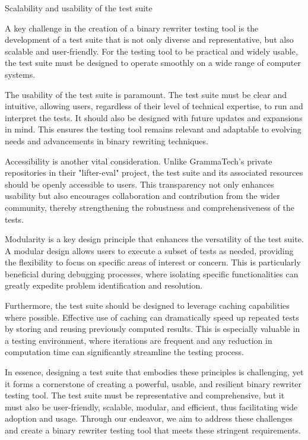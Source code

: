 \documentclass[a4paper,11pt,oneside]{report}
\begin{document}
Scalability and usability of the test suite

A key challenge in the creation of a binary rewriter testing tool is the development of
a test suite that is not only diverse and representative, but also scalable and user-friendly.
For the testing tool to be practical and widely usable, the test suite must be designed to
operate smoothly on a wide range of computer systems.

The usability of the test suite is paramount. The test suite must be clear and
intuitive, allowing users, regardless of their level of technical expertise, to run and interpret
the tests. It should also be designed with future updates and expansions in mind. This
ensures the testing tool remains relevant and adaptable to evolving needs and
advancements in binary rewriting techniques.

Accessibility is another vital consideration. Unlike GrammaTech's private repositories
in their "lifter-eval" project, the test suite and its associated resources should be openly
accessible to users. This transparency not only enhances usability but also encourages
collaboration and contribution from the wider community, thereby strengthening the
robustness and comprehensiveness of the tests.

Modularity is a key design principle that enhances the versatility of the test suite. A
modular design allows users to execute a subset of tests as needed, providing the flexibility
to focus on specific areas of interest or concern. This is particularly beneficial during
debugging processes, where isolating specific functionalities can greatly expedite problem
identification and resolution.

Furthermore, the test suite should be designed to leverage caching capabilities
where possible. Effective use of caching can dramatically speed up repeated tests by storing
and reusing previously computed results. This is especially valuable in a testing
environment, where iterations are frequent and any reduction in computation time can
significantly streamline the testing process.

In essence, designing a test suite that embodies these principles is challenging, yet it
forms a cornerstone of creating a powerful, usable, and resilient binary rewriter testing tool.
The test suite must be representative and comprehensive, but it must also be user-friendly,
scalable, modular, and efficient, thus facilitating wide adoption and usage. Through our
endeavor, we aim to address these challenges and create a binary rewriter testing tool that
meets these stringent requirements.
\end{document}
